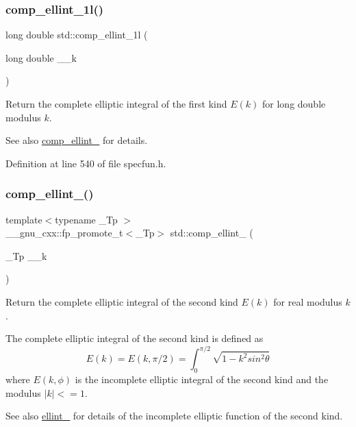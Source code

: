 \subsubsection{\texorpdfstring{comp\+\_\+ellint\+\_\+1l()}{comp\_ellint\_1l()}}
{\footnotesize\ttfamily long double std\+::comp\+\_\+ellint\+\_\+1l (\begin{DoxyParamCaption}\item[{long double}]{\+\_\+\+\_\+k }\end{DoxyParamCaption})\hspace{0.3cm}{\ttfamily [inline]}}

Return the complete elliptic integral of the first kind $ E(k) $ for {\ttfamily long double} modulus $ k $.

\begin{DoxySeeAlso}{See also}
\hyperlink{group__tr29124__math__spec__func_gad559217fb01e7a8b7a6e23eeedda64be}{comp\+\_\+ellint\+\_} for details. 
\end{DoxySeeAlso}


Definition at line 540 of file specfun.\+h.

\mbox{\label{group__tr29124__math__spec__func_gaadf288465eea84ec609d93de96200aaa}} 
\subsubsection{\texorpdfstring{comp\+\_\+ellint\+\_()}{comp\_ellint\_2()}}
{\footnotesize\ttfamily template$<$typename \+\_\+\+Tp $>$ \\
\+\_\+\+\_\+gnu\+\_\+cxx\+::fp\+\_\+promote\+\_\+t$<$\+\_\+\+Tp$>$ std\+::comp\+\_\+ellint\+\_ (\begin{DoxyParamCaption}\item[{\+\_\+\+Tp}]{\+\_\+\+\_\+k }\end{DoxyParamCaption})\hspace{0.3cm}{\ttfamily [inline]}}

Return the complete elliptic integral of the second kind $ E(k) $ for real modulus $ k $.

The complete elliptic integral of the second kind is defined as \[ E(k) = E(k,\pi/2) = \int_0^{\pi/2}\sqrt{1 - k^2 sin^2\theta} \] where $ E(k,\phi) $ is the incomplete elliptic integral of the second kind and the modulus $ |k| <= 1 $. \begin{DoxySeeAlso}{See also}
\hyperlink{group__tr29124__math__spec__func_gad64cb9babb7837d585912b1a94b2cb7d}{ellint\+\_} for details of the incomplete elliptic function of the second kind.
\end{DoxySeeAlso}

